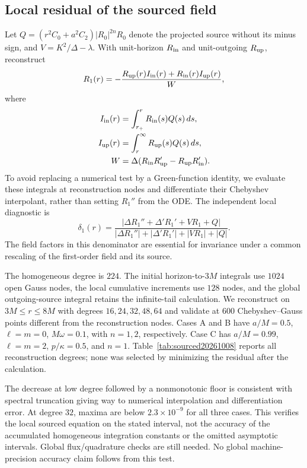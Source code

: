 \documentclass[aps,prd,twocolumn,10pt,nofootinbib,superscriptaddress,floatfix]{revtex4-2}
\begin{document}
\subsection{Local residual of the sourced field}

Let $Q=(r^2C_0+a^2C_2)|R_0|^{2n}R_0$ denote the projected source without
its minus sign, and $V=K^2/\Delta-\lambda$.  With unit-horizon $R_{\rm in}$
and unit-outgoing $R_{\rm up}$, reconstruct
\begin{equation}
R_1(r)=-\frac{R_{\rm up}(r)I_{\rm in}(r)
                    +R_{\rm in}(r)I_{\rm up}(r)}{W},
\end{equation}
where
\begin{align}
I_{\rm in}(r)&=\int_{r_+}^{r}R_{\rm in}(s)Q(s)\,ds,\\
I_{\rm up}(r)&=\int_r^\infty R_{\rm up}(s)Q(s)\,ds,\\
W&=\Delta(R_{\rm in}R_{\rm up}'-R_{\rm up}R_{\rm in}').
\end{align}
To avoid replacing a numerical test by a Green-function identity, we
evaluate these integrals at reconstruction nodes and differentiate their
Chebyshev interpolant, rather than setting $R_1''$ from the ODE.  The
independent local diagnostic is
\begin{equation}
\delta_1(r)=\frac{|\Delta R_1''+\Delta'R_1'+VR_1+Q|}
{|\Delta R_1''|+|\Delta'R_1'|+|VR_1|+|Q|}.
\label{eq:sourcedresidual20261008}
\end{equation}
The field factors in this denominator are essential for invariance under
a common rescaling of the first-order field and its source.

The homogeneous degree is $224$.  The initial horizon-to-$3M$ integrals
use $1024$ open Gauss nodes, the local cumulative increments use $128$
nodes, and the global outgoing-source integral retains the infinite-tail
calculation.  We reconstruct on $3M\le r\le8M$ with degrees
$16,24,32,48,64$ and validate at $600$ Chebyshev--Gauss points different
from the reconstruction nodes.  Cases A and B have $a/M=0.5$,
$\ell=m=0$, $M\omega=0.1$, with $n=1,2$, respectively.  Case C has
$a/M=0.99$, $\ell=m=2$, $p/\kappa=0.5$, and $n=1$.
Table~\ref{tab:sourced20261008} reports all reconstruction degrees;
none was selected by minimizing the residual after the calculation.

The decrease at low degree followed by a nonmonotonic floor is consistent
with spectral truncation giving way to numerical interpolation and
differentiation error.  At degree $32$, maxima are below
$2.3\times10^{-9}$ for all three cases.  This verifies the local sourced
equation on the stated interval, not the accuracy of the accumulated
homogeneous integration constants or the omitted asymptotic intervals.
Global flux/quadrature checks are still needed.  No global
machine-precision accuracy claim follows from this test.
\end{document}
